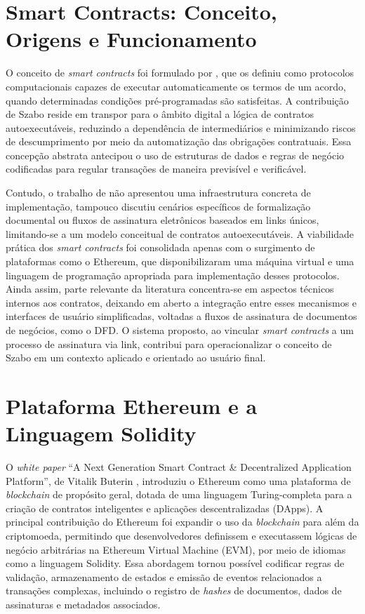 \documentclass[
    12pt,
    a4paper,
    oneside,
    chapter=TITLE,
    section=TITLE,
    subsection=TITLE,
    subsubsection=TITLE,
    sumario=tradicional,
    english,
    brazil
]{abntex2}
\begin{document}
\section{Smart Contracts: Conceito, Origens e Funcionamento}

O conceito de \emph{smart contracts} foi formulado por
, que os definiu como protocolos computacionais
capazes de executar automaticamente os termos de um acordo, quando
determinadas condições pré-programadas são satisfeitas. A
contribuição de Szabo reside em transpor para o âmbito digital a
lógica de contratos autoexecutáveis, reduzindo a dependência de
intermediários e minimizando riscos de descumprimento por meio da
automatização das obrigações contratuais. Essa concepção abstrata
antecipou o uso de estruturas de dados e regras de negócio codificadas
para regular transações de maneira previsível e verificável.

Contudo, o trabalho de  não apresentou uma infraestrutura
concreta de implementação, tampouco discutiu cenários específicos de
formalização documental ou fluxos de assinatura eletrônicos baseados em
links únicos, limitando-se a um modelo conceitual de contratos
autoexecutáveis. A viabilidade prática dos \emph{smart contracts} foi
consolidada apenas com o surgimento de plataformas como o Ethereum,
que disponibilizaram uma máquina virtual e uma linguagem de
programação apropriada para implementação desses protocolos. Ainda
assim, parte relevante da literatura concentra-se em aspectos
técnicos internos aos contratos, deixando em aberto a integração
entre esses mecanismos e interfaces de usuário simplificadas,
voltadas a fluxos de assinatura de documentos de negócios, como o
DFD. O sistema proposto, ao vincular \emph{smart contracts} a um
processo de assinatura via link, contribui para operacionalizar o
conceito de Szabo em um contexto aplicado e orientado ao usuário
final.

\section{Plataforma Ethereum e a Linguagem Solidity}
\label{sec:ethereum}

O \emph{white paper} ``A Next Generation Smart Contract \&
Decentralized Application Platform'', de Vitalik Buterin
\cite{buterin2014}, introduziu o Ethereum como uma plataforma de
\emph{blockchain} de propósito geral, dotada de uma linguagem
Turing-completa para a criação de contratos inteligentes e
aplicações descentralizadas (DApps). A principal contribuição do
Ethereum foi expandir o uso da \emph{blockchain} para além da
criptomoeda, permitindo que desenvolvedores definissem e executassem
lógicas de negócio arbitrárias na Ethereum Virtual Machine (EVM), por
meio de idiomas como a linguagem Solidity. Essa abordagem tornou
possível codificar regras de validação, armazenamento de estados e
emissão de eventos relacionados a transações complexas, incluindo o
registro de \emph{hashes} de documentos, dados de assinaturas e
metadados associados.
\end{document}
